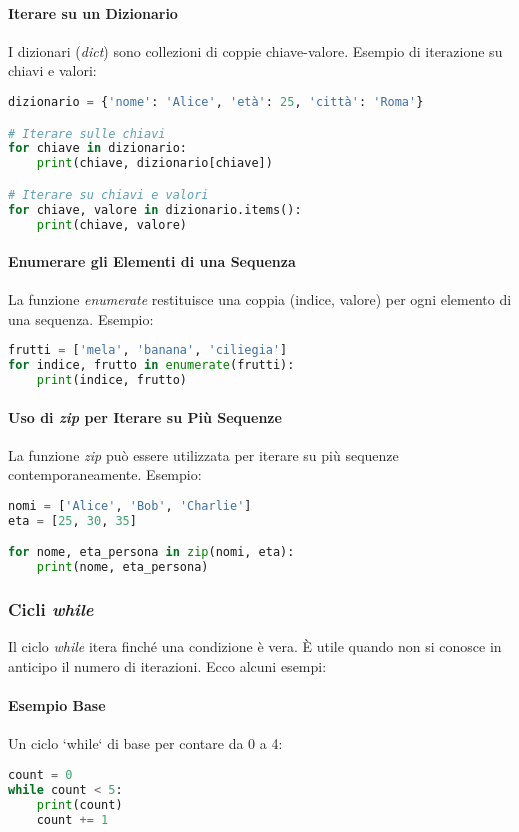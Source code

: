 \paragraph{Iterare su un Dizionario}
I dizionari (\textit{dict}) sono collezioni di coppie chiave-valore. Esempio di iterazione su chiavi e valori:
\begin{lstlisting}[language=Python]
dizionario = {'nome': 'Alice', 'età': 25, 'città': 'Roma'}

# Iterare sulle chiavi
for chiave in dizionario:
    print(chiave, dizionario[chiave])

# Iterare su chiavi e valori
for chiave, valore in dizionario.items():
    print(chiave, valore)
\end{lstlisting}

\paragraph{Enumerare gli Elementi di una Sequenza}
La funzione \textit{enumerate} restituisce una coppia (indice, valore) per ogni elemento di una sequenza. Esempio:
\begin{lstlisting}[language=Python]
frutti = ['mela', 'banana', 'ciliegia']
for indice, frutto in enumerate(frutti):
    print(indice, frutto)
\end{lstlisting}

\paragraph{Uso di \textit{zip} per Iterare su Più Sequenze}
La funzione \textit{zip} può essere utilizzata per iterare su più sequenze contemporaneamente. Esempio:
\begin{lstlisting}[language=Python]
nomi = ['Alice', 'Bob', 'Charlie']
eta = [25, 30, 35]

for nome, eta_persona in zip(nomi, eta):
    print(nome, eta_persona)
\end{lstlisting}

\subsubsection{Cicli \textit{while}}
Il ciclo \textit{while} itera finché una condizione è vera. È utile quando non si conosce in anticipo il numero di iterazioni. Ecco alcuni esempi:

\paragraph{Esempio Base}
Un ciclo `while` di base per contare da 0 a 4:
\begin{lstlisting}[language=Python]
count = 0
while count < 5:
    print(count)
    count += 1
\end{lstlisting}

